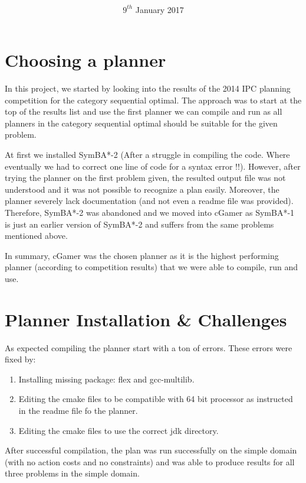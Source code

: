 \documentclass{article}
\title{
\vspace{2in}
\textmd{\textbf{\hmwkClass\ \\ \hmwkTitle}}\\
\vspace{0.1in}\large{\textit{\hmwkClassInstructor\ }}
\vspace{3in}
}
\author{\textbf{\hmwkAuthorName}}
\date{$9^{th}$ January 2017} %
\begin{document}
\maketitle
\newpage

\section{Choosing a planner}
In this project, we started by looking into the results of the 2014 IPC planning competition \cite{ipc}  for the category sequential optimal. The approach was to start at the top of the results list and use the first planner we can compile and run as all planners in the category sequential optimal should be suitable for the given problem.

At first we installed SymBA*-2 \cite{symba2} (After a struggle in compiling the code. Where eventually we had to correct one line of code for a syntax error !!). However, after trying the planner on the first problem given, the resulted output file was not understood and it was not possible to recognize a plan easily. Moreover, the planner severely lack documentation (and not even a readme file was provided). Therefore, SymBA*-2 was abandoned and we moved into cGamer \cite{cGamer} as SymBA*-1 \cite{symba2} is just an earlier version of SymBA*-2 and suffers from the same problems mentioned above.

In summary, cGamer was the chosen planner as it is the highest performing planner (according to competition results) that we were able to compile, run and use.

\section{Planner Installation \& Challenges}
As expected compiling the planner start with a ton of errors. These errors were fixed by:
\begin{enumerate}
	\item Installing missing package: flex and gcc-multilib.
	\item Editing the cmake files to be compatible with 64 bit processor as instructed in the readme file fo the planner.
	\item Editing the cmake files to use the correct jdk directory.
\end{enumerate}

After successful compilation, the plan was run successfully on the simple domain (with no action costs and no constraints) and was able to produce results for all three problems in the simple domain.
\end{document}
